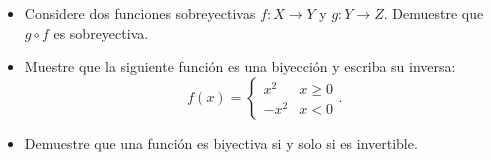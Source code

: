\documentclass[9pt]{extarticle}
\begin{document}
\begin{itemize}
    \item[\bf{[2 pt]}]  Considere dos funciones sobreyectivas $f:X\to Y$ y $g:Y\to Z$. Demuestre que $g\circ f$ es sobreyectiva. 


    \item[\bf{[2 pt]}]  Muestre que la siguiente función es una biyección y escriba su inversa: 
                $$ f(x) = \begin{cases} x^2 & x\geq 0 \\ -x^2 & x < 0 \end{cases}. $$

    \item[\bf{[3 pt]}] Demuestre que una función es biyectiva si y solo si es invertible.
\end{itemize} %

\vspace{1cm}
\end{document}
